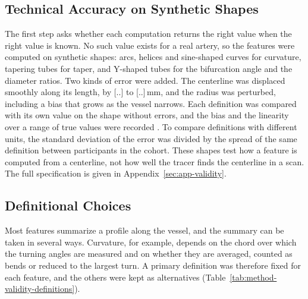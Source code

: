 \subsection{Technical Accuracy on Synthetic Shapes}
\label{sec:method-validity-accuracy}

The first step asks whether each computation returns the right value when the right value is known.
No such value exists for a real artery, so the features were computed on synthetic shapes: arcs, helices and sine-shaped curves for curvature, tapering tubes for taper, and Y-shaped tubes for the bifurcation angle and the diameter ratios.
Two kinds of error were added.
The centerline was displaced smoothly along its length, by [..] to [..]\,mm, and the radius was perturbed, including a bias that grows as the vessel narrows.
Each definition was compared with its own value on the shape without errors, and the bias and the linearity over a range of true values were recorded \cite{raunig2015qib}.
To compare definitions with different units, the standard deviation of the error was divided by the spread of the same definition between participants in the cohort.
These shapes test how a feature is computed from a centerline, not how well the tracer finds the centerline in a scan.
The full specification is given in Appendix~\ref{sec:app-validity}.

\subsection{Definitional Choices}
\label{sec:method-validity-definitions}

Most features summarize a profile along the vessel, and the summary can be taken in several ways.
Curvature, for example, depends on the chord over which the turning angles are measured and on whether they are averaged, counted as bends or reduced to the largest turn.
A primary definition was therefore fixed for each feature, and the others were kept as alternatives (Table~\ref{tab:method-validity-definitions}).

